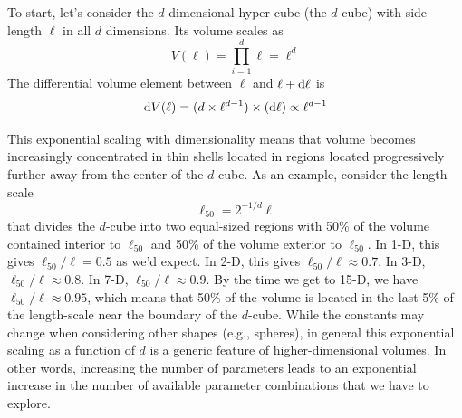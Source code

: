\documentclass[12pt, titlepage]{article}
\newcommand{\deriv}{\ensuremath{{\rm d}}}  %
\begin{document}
To start, let's consider the
$d$-dimensional hyper-cube (the $d$-cube)
with side length $\ell$ in all $d$ dimensions. Its volume scales as
\begin{equation}
    V(\ell) = \prod_{i=1}^{d} \ell = \ell^d
\end{equation}
The differential volume element between $\ell$ and
$\ell + \deriv \ell$ is
\begin{equation}
    \deriv V(\ell) = (d \times \ell^{d-1}) \times (\deriv\ell) \propto \ell^{d-1}
\end{equation}

This exponential scaling with dimensionality means that volume becomes
increasingly concentrated in thin shells located in regions located
progressively further away from the center of the $d$-cube. 
As an example, consider the length-scale
\begin{equation}
    \ell_{50} = 2^{-1/d} \ell
\end{equation}
that divides the $d$-cube into two equal-sized regions
with 50\% of the volume contained interior to $\ell_{50}$ and
50\% of the volume exterior to $\ell_{50}$. 
In 1-D, this gives $\ell_{50}/\ell = 0.5$ as we'd
expect. In 2-D, this gives $\ell_{50}/\ell \approx 0.7$. In 3-D,
$\ell_{50}/\ell \approx 0.8$. In 7-D, $\ell_{50}/\ell \approx 0.9$.
By the time we get to 15-D, we have $\ell_{50} /\ell\approx 0.95$,
which means that 50\% of the volume is located in the last 5\% of the 
length-scale near the boundary of the $d$-cube.
While the constants may change when considering other shapes (e.g., spheres),
in general this exponential scaling as a function of $d$ is a generic feature
of higher-dimensional volumes. In other words, increasing the number
of parameters leads to an exponential increase in the number of
available parameter combinations that we have to explore.
\end{document}
